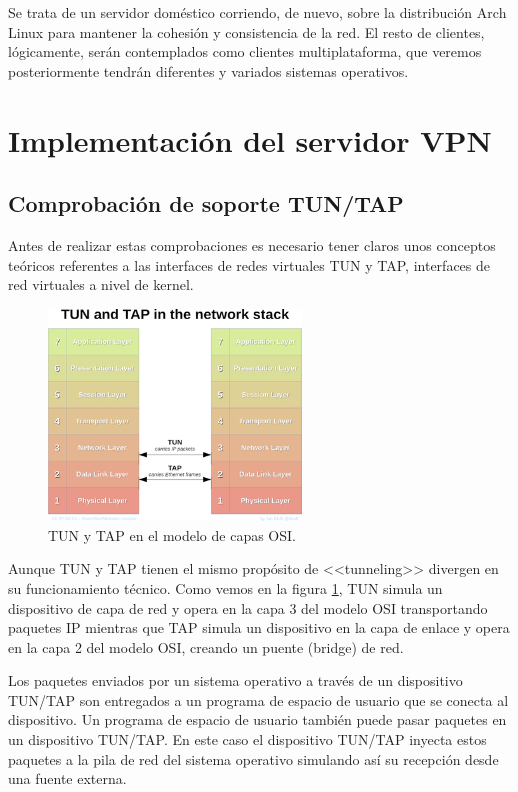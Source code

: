 \documentclass[a4paper, 11pt, titlepage]{article}
\begin{document}
        Se trata de un servidor doméstico corriendo, de nuevo, sobre la distribución Arch Linux para mantener
        la cohesión y consistencia de la red. El resto de clientes, lógicamente, serán contemplados
        como clientes multiplataforma, que veremos posteriormente tendrán diferentes y variados sistemas
        operativos.

\section{Implementación del servidor VPN}

    \subsection{Comprobación de soporte TUN/TAP}
    
        Antes de realizar estas comprobaciones es necesario tener claros unos conceptos teóricos referentes a las interfaces de redes 
        virtuales TUN y TAP, interfaces de red virtuales a nivel de kernel.
        
        \begin{figure}[htp]
            \centering
            \includegraphics[width=0.6\textwidth]{resources/tuntap01.png}
            \caption{TUN y TAP en el modelo de capas OSI.}
            \label{fig:tuntap01}
        \end{figure}
    
        Aunque TUN y TAP tienen el mismo propósito de <<tunneling>> divergen en su funcionamiento técnico. Como vemos en la figura 
        \ref{fig:tuntap01}, TUN simula un dispositivo de capa de red y opera en la capa 3 del modelo OSI transportando paquetes IP mientras
        que TAP simula un dispositivo en la capa de enlace y opera en la capa 2 del modelo OSI, creando un puente (bridge) de red.
    
        Los paquetes enviados por un sistema operativo a través de un dispositivo TUN/TAP son entregados a un programa de espacio de usuario
        que se conecta al dispositivo. Un programa de espacio de usuario también puede pasar paquetes en un dispositivo TUN/TAP. En este caso 
        el dispositivo TUN/TAP inyecta estos paquetes a la pila de red del sistema operativo simulando así su recepción desde una fuente externa.
    
\end{document}
